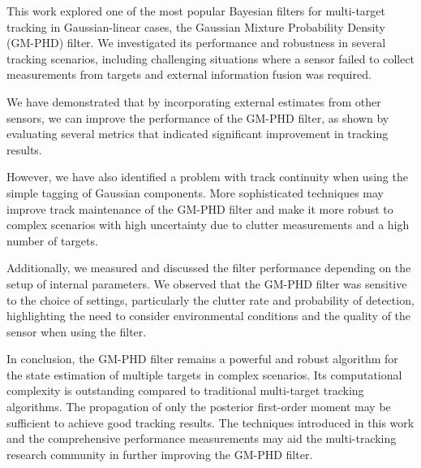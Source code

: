 This work explored one of the most popular Bayesian filters for multi-target tracking in Gaussian-linear cases, the Gaussian Mixture Probability Density (GM-PHD) filter. We investigated its performance and robustness in several tracking scenarios, including challenging situations where a sensor failed to collect measurements from targets and external information fusion was required.

We have demonstrated that by incorporating external estimates from other sensors, we can improve the performance of the GM-PHD filter, as shown by evaluating several metrics that indicated significant improvement in tracking results.

However, we have also identified a problem with track continuity when using the simple tagging of Gaussian components. More sophisticated techniques may improve track maintenance of the GM-PHD filter and make it more robust to complex scenarios with high uncertainty due to clutter measurements and a high number of targets.

Additionally, we measured and discussed the filter performance depending on the setup of internal parameters. We observed that the GM-PHD filter was sensitive to the choice of settings, particularly the clutter rate and probability of detection, highlighting the need to consider environmental conditions and the quality of the sensor when using the filter.

In conclusion, the GM-PHD filter remains a powerful and robust algorithm for the state estimation of multiple targets in complex scenarios. Its computational complexity is outstanding compared to traditional multi-target tracking algorithms. The propagation of only the posterior first-order moment may be sufficient to achieve good tracking results. The techniques introduced in this work and the comprehensive performance measurements may aid the multi-tracking research community in further improving the GM-PHD filter.
